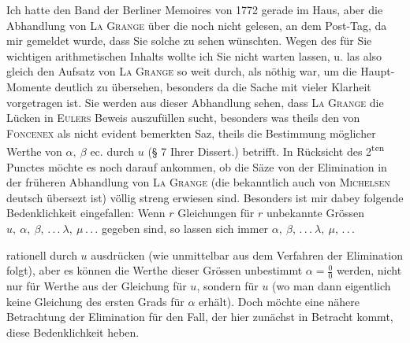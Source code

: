Ich hatte den Band der Berliner Memoires von 1772 gerade im Haus, aber die Abhandlung von
\textsc{La Grange} über die  noch nicht gelesen, an dem Post-Tag,
da mir gemeldet wurde, dass Sie solche zu sehen wünschten. Wegen des für Sie wichtigen
arithmetischen Inhalts wollte ich Sie nicht warten lassen, u. las also gleich den Aufsatz von
\textsc{La Grange} so weit durch, als nöthig war, um die Haupt-Momente deutlich zu übersehen,
besonders da die Sache mit vieler Klarheit vorgetragen ist. Sie werden aus dieser Abhandlung
sehen, dass \textsc{La Grange} die Lücken in \textsc{Eulers} Beweis auszufüllen sucht, besonders
was theils den von \textsc{Foncenex} als nicht evident bemerkten Saz, theils die Bestimmung
möglicher Werthe von $\alpha,\ \beta$ ec. durch $u$ (§ 7 Ihrer Dissert.) betrifft.
In Rücksicht des 2\textsuperscript{ten} Punctes möchte es noch darauf ankommen, ob die Säze
von der Elimination in der früheren Abhandlung von \textsc{La Grange} (die bekanntlich auch
von \textsc{Michelsen} deutsch übersezt ist) völlig streng erwiesen sind. Besonders ist mir
dabey folgende Bedenklichkeit eingefallen: Wenn $r$ Gleichungen für $r$ unbekannte Grössen
$u,\ \alpha,\ \beta,\,.\,.\,.\ \lambda,\ \mu\,.\,.\,.$ gegeben sind, so lassen sich
 immer $\alpha,\ \beta,\,.\,.\,.\ \lambda,\ \mu,\,.\,.\,.$
\par\clearpage
{}
\noindent rationell durch $u$ ausdrücken (wie unmittelbar aus dem Verfahren der Elimination
folgt), aber es können die Werthe dieser Grössen unbestimmt $\alpha=\frac00$ werden, nicht
nur für  Werthe aus der Gleichung für $u$, sondern für 
$u$ (wo man dann eigentlich keine Gleichung des ersten Grads für $\alpha$ erhält).
Doch möchte eine nähere Betrachtung der Elimination für den Fall, der hier zunächst in
Betracht kommt, diese Bedenklichkeit heben.

